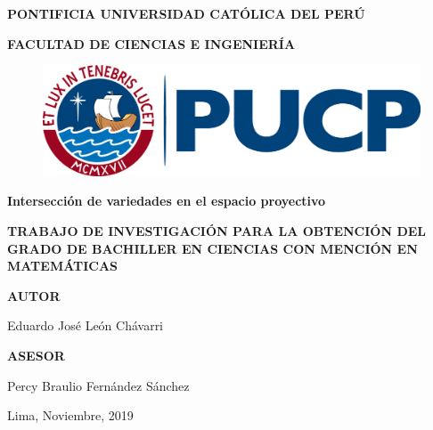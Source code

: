 \begin{center}

\vspace*{0.5cm}

\Large \textsf{\textbf{PONTIFICIA UNIVERSIDAD CATÓLICA DEL PERÚ}}

\vspace*{0.5cm}

\large \textsf{\textbf{FACULTAD DE CIENCIAS E INGENIERÍA}}

\vspace*{2cm}

\begin{figure}[htb]
\begin{center}
\includegraphics[width=12cm]{logo.png}\\
\end{center}
\end{figure}

\vspace*{1cm}

\Large \textsf{\textbf{Intersección de variedades en el espacio proyectivo}}

\vspace*{0.5cm}

\large \textsf{\textbf{TRABAJO DE INVESTIGACIÓN PARA LA OBTENCIÓN DEL GRADO DE BACHILLER EN CIENCIAS CON MENCIÓN EN MATEMÁTICAS}}

\vspace*{1.5cm}

\textsf{\textbf{AUTOR}}

\vspace*{0.3cm}

\textsf{Eduardo José León Chávarri}

\vspace*{1.5cm}

\textsf{\textbf{ASESOR}}

\vspace*{0.3cm}

\textsf{Percy Braulio Fernández Sánchez}

\vspace*{2cm}

\textsf{Lima, Noviembre, 2019}

\end{center}
